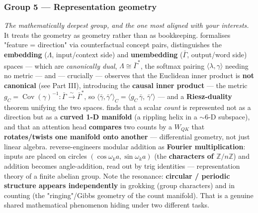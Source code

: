 \subsubsection*{Group 5 --- Representation geometry}
\emph{The mathematically deepest group, and the one most aligned with your interests.} It treats the geometry as geometry rather than as bookkeeping. \textcite{linear-representation-hypothesis-geometry} formalises "feature = direction" via counterfactual concept pairs, distinguishes the \textbf{embedding} ($\Lambda$, input/context side) and \textbf{unembedding} ($\bar\Gamma$, output/word side) spaces --- which are \emph{canonically dual}, $\Lambda\cong\bar\Gamma^{*}$, the softmax pairing $\langle\lambda,\gamma\rangle$ needing no metric --- and --- crucially --- observes that the Euclidean inner product is \textbf{not canonical} (see Part III), introducing the \textbf{causal inner product} --- the metric $g_C=\operatorname{Cov}(\gamma)^{-1}:\bar\Gamma\xrightarrow{\sim}\bar\Gamma^{*}$, so $\langle\bar\gamma,\bar\gamma'\rangle_C=\langle g_C\,\bar\gamma,\,\bar\gamma'\rangle$ --- and a \textbf{Riesz-duality} theorem unifying the two spaces. \textcite{when-models-manipulate-manifolds-counting} finds that a scalar \emph{count} is represented not as a direction but as a \textbf{curved 1-D manifold} (a rippling helix in a $\sim$6-D subspace), and that an attention head \textbf{compares} two counts by a $W_{QK}$ that \textbf{rotates/twists one manifold onto another} --- differential geometry, not just linear algebra. \textcite{progress-measures-for-grokking} reverse-engineers modular addition as \textbf{Fourier multiplication}: inputs are placed on circles $(\cos\omega_k a,\sin\omega_k a)$ (the \textbf{characters of $\mathbb{Z}/n\mathbb{Z}$}) and addition becomes angle-addition, read out by trig identities --- representation theory of a finite abelian group. Note the resonance: \textbf{circular / periodic structure appears independently} in grokking (group characters) and in counting (the "ringing"/Gibbs geometry of the count manifold). That is a genuine shared mathematical phenomenon hiding under two different tasks.


